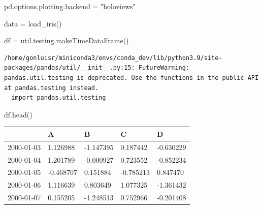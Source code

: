 \documentclass[
  letterpaper,
  DIV=11,
  numbers=noendperiod]{scrartcl}
\newenvironment{Shaded}{\begin{snugshade}}{\end{snugshade}}
\newcommand{\NormalTok}[1]{\textcolor[rgb]{0.00,0.23,0.31}{#1}}
\newcommand{\OperatorTok}[1]{\textcolor[rgb]{0.37,0.37,0.37}{#1}}
\newcommand{\StringTok}[1]{\textcolor[rgb]{0.13,0.47,0.30}{#1}}
\begin{document}
\begin{Shaded}
\begin{Highlighting}[]

\NormalTok{pd.options.plotting.backend }\OperatorTok{=} \StringTok{"holoviews"}
\end{Highlighting}
\end{Shaded}

\begin{Shaded}
\begin{Highlighting}[]

\NormalTok{data }\OperatorTok{=}\NormalTok{ load\_iris()}
\end{Highlighting}
\end{Shaded}

\begin{Shaded}
\begin{Highlighting}[]

\NormalTok{df }\OperatorTok{=}\NormalTok{ util.testing.makeTimeDataFrame()}
\end{Highlighting}
\end{Shaded}

\begin{verbatim}
/home/gonluisr/miniconda3/envs/conda_dev/lib/python3.9/site-packages/pandas/util/__init__.py:15: FutureWarning: pandas.util.testing is deprecated. Use the functions in the public API at pandas.testing instead.
  import pandas.util.testing
\end{verbatim}

\begin{Shaded}
\begin{Highlighting}[]

\NormalTok{df.head()}
\end{Highlighting}
\end{Shaded}

\begin{longtable}[]{@{}lllll@{}}
\toprule()
& A & B & C & D \\
\midrule()
\endhead
2000-01-03 & 1.126988 & -1.147395 & 0.187442 & -0.630229 \\
2000-01-04 & 1.201789 & -0.000927 & 0.723552 & -0.852234 \\
2000-01-05 & -0.468707 & 0.151884 & -0.785213 & 0.847470 \\
2000-01-06 & 1.116639 & 0.803649 & 1.077325 & -1.361432 \\
2000-01-07 & 0.155205 & -1.248513 & 0.752966 & -0.201408 \\
\bottomrule()
\end{longtable}
\end{document}
